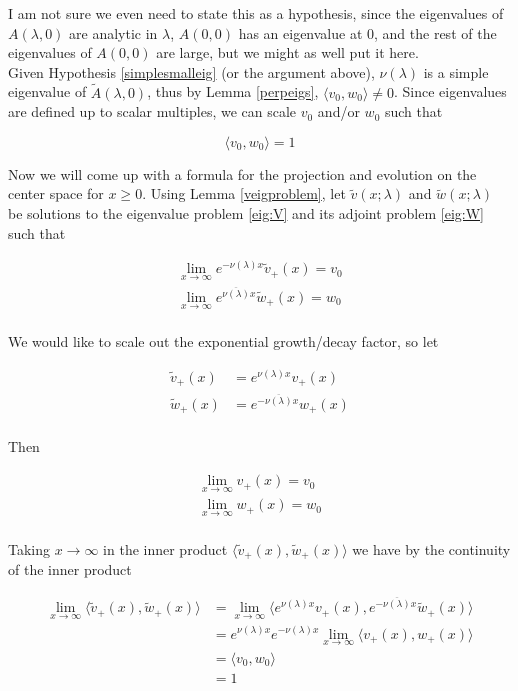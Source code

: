 \documentclass[12pt]{article}
\begin{document}
I am not sure we even need to state this as a hypothesis, since the eigenvalues of $A(\lambda, 0)$ are analytic in $\lambda$, $A(0, 0)$ has an eigenvalue at 0, and the rest of the eigenvalues of $A(0, 0)$ are large, but we might as well put it here.\\

Given Hypothesis \ref{simplesmalleig} (or the argument above), $\nu(\lambda)$ is a simple eigenvalue of $\tilde{A}(\lambda, 0)$, thus by Lemma \ref{perpeigs}, $\langle v_0, w_0 \rangle \neq 0$. Since eigenvalues are defined up to scalar multiples, we can scale $v_0$ and/or $w_0$ such that

\[
\langle v_0, w_0 \rangle = 1
\]
 
Now we will come up with a formula for the projection and evolution on the center space for $x \geq 0$. Using Lemma \ref{veigproblem}, let $\tilde{v}(x; \lambda)$ and $\tilde{w}(x; \lambda)$ be solutions to the eigenvalue problem \eqref{eig:V} and its adjoint problem \eqref{eig:W} such that

\begin{align*}
\lim_{x \rightarrow \infty} e^{-\nu(\lambda) x} \tilde{v}_+(x) = v_0 \\
\lim_{x \rightarrow \infty} e^{\overline{\nu(\lambda)} x} \tilde{w}_+(x) = w_0 \\
\end{align*}

We would like to scale out the exponential growth/decay factor, so let

\begin{align*}
\tilde{v}_+(x) &= e^{\nu(\lambda) x } v_+(x) \\
\tilde{w}_+(x) &= e^{-\overline{\nu(\lambda)} x } w_+(x) \\
\end{align*}

Then

\begin{align*}
\lim_{x \rightarrow \infty} v_+(x) = v_0 \\
\lim_{x \rightarrow \infty} w_+(x) = w_0 \\
\end{align*}

Taking $x \rightarrow \infty$ in the inner product $\langle \tilde{v}_+(x), \tilde{w}_+(x) \rangle$ we have by the continuity of the inner product

\begin{align*}
\lim_{x \rightarrow \infty} \langle \tilde{v}_+(x), \tilde{w}_+(x) \rangle
&= \lim_{x \rightarrow \infty} \langle e^{\nu(\lambda) x } v_+(x), e^{-\overline{\nu(\lambda)} x} \tilde{w}_+(x) \rangle \\
&= e^{\nu(\lambda) x } e^{-\nu(\lambda) x } \lim_{x \rightarrow \infty} \langle v_+(x), w_+(x) \rangle \\
&= \langle v_0, w_0 \rangle \\
&= 1
\end{align*}
\end{document}
